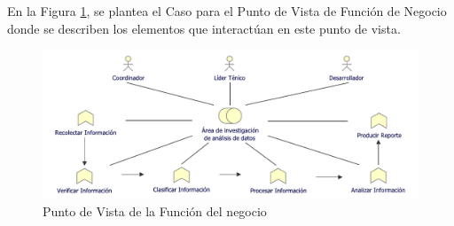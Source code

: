 En la Figura \ref{PvFuncion}, se plantea el Caso para el Punto de Vista de Función de Negocio donde se describen los elementos que interactúan en este punto de vista.

\begin{figure}[h!]
	\centering
	\includegraphics[width=1\linewidth]{ARQUITECTURA/imgs/CapaNegocio/3_PvFuncion}
	\caption{Punto de Vista de la Función del negocio}
	\label{PvFuncion}
\end{figure}

